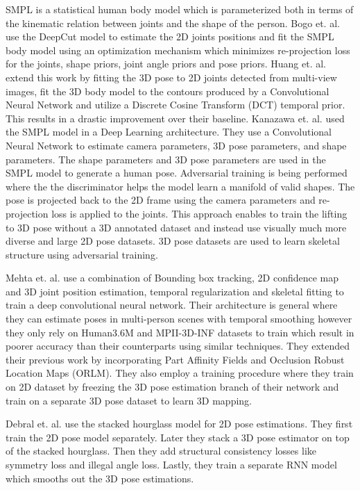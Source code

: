 SMPL \parencite{loper2015smpl} is a statistical human body model which is parameterized both in terms of the kinematic relation between joints and the shape of the person. Bogo et. al. \parencite{bogo2016keep} use the DeepCut \parencite{pishchulin2016deepcut} model to estimate the 2D joints positions and fit the SMPL body model using an optimization mechanism which minimizes re-projection loss for the joints, shape priors, joint angle priors and pose priors. Huang et. al. extend this work \parencite{huang2017towards} by fitting the 3D pose to 2D joints detected from multi-view images, fit the 3D body model to the contours produced by a Convolutional Neural Network and utilize a Discrete Cosine Transform (DCT) \parencite{akhter2012bilinear} temporal prior. This results in a drastic improvement over their baseline. Kanazawa et. al. \parencite{kanazawa2017end} used the SMPL model in a Deep Learning architecture. They use a Convolutional Neural Network to estimate camera parameters, 3D pose parameters, and shape parameters. The shape parameters and 3D pose parameters are used in the SMPL model to generate a human pose. Adversarial training is being performed where the the discriminator helps the model learn a manifold of valid shapes. The pose is projected back to the 2D frame using the camera parameters and re-projection loss is applied to the joints. This approach enables to train the lifting to 3D pose without a 3D annotated dataset and instead use visually much more diverse and large 2D pose datasets. 3D pose datasets are used to learn skeletal structure using adversarial training.   

Mehta et. al. \parencite{mehta2017vnect} use a combination of Bounding box tracking, 2D confidence map and 3D joint position estimation, temporal regularization and skeletal fitting to train a deep convolutional neural network. Their architecture is general where they can estimate poses in multi-person scenes with temporal smoothing however they only rely on Human3.6M and MPII-3D-INF datasets to train which result in poorer accuracy than their counterparts using similar techniques. They extended their previous work \parencite{mehta2017single} by incorporating Part Affinity Fields \parencite{cao2016realtime} and Occlusion Robust Location Maps (ORLM). They also employ a training procedure where they train on 2D dataset by freezing the 3D pose estimation branch of their network and train on a separate 3D pose dataset to learn 3D mapping.

Debral et. al. \parencite{dabral2017structure} use the stacked hourglass \parencite{newell2016stacked} model for 2D pose estimations. They first train the 2D pose model separately. Later they stack a 3D pose estimator on top of the stacked hourglass. Then they add structural consistency losses like symmetry loss and illegal angle loss. Lastly, they train a separate RNN model which smooths out the 3D pose estimations.
